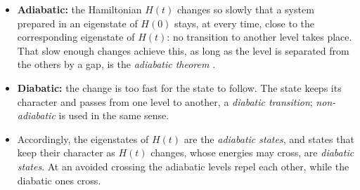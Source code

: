 \documentclass[handoutsbeamer.tex]{subfiles}
\begin{document}
\begin{frame}
\onp{\footnotesize}
\begin{itemize}\setlength\itemsep{0.3em}
    \item \textbf{Adiabatic:} the Hamiltonian $H(t)$ changes so slowly that a system prepared in an eigenstate of $H(0)$ stays, at every time, close to the corresponding eigenstate of $H(t)$: no transition to another level takes place. That slow enough changes achieve this, as long as the level is separated from the others by a gap, is the \emph{adiabatic theorem} \citep{born1928adiabatic}.
    \item \textbf{Diabatic:} the change is too fast for the state to follow. The state keeps its character and passes from one level to another, a \emph{diabatic transition}; \emph{non-adiabatic} is used in the same sense.
    \item Accordingly, the eigenstates of $H(t)$ are the \emph{adiabatic states}, and states that keep their character as $H(t)$ changes, whose energies may cross, are \emph{diabatic states}. At an avoided crossing the adiabatic levels repel each other, while the diabatic ones cross.
\end{itemize}
\end{frame}
\end{document}
